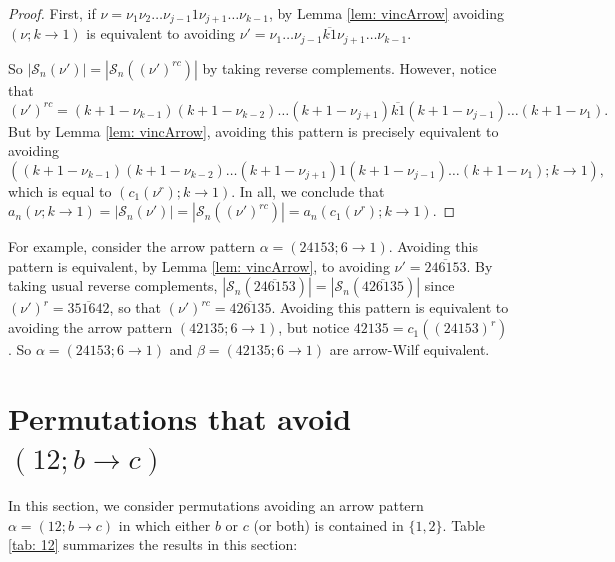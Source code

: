 \documentclass[11pt]{article}
\newcommand{\ol}[1]{\overline{#1}}
\renewcommand\S{\mathcal S}
\theoremstyle{definition}
\begin{document}
\begin{proof}
    First, if $\nu = \nu_1\nu_2\ldots \nu_{j-1} 1 \nu_{j+1} \ldots \nu_{k-1}$, by Lemma \ref{lem: vincArrow} avoiding $(\nu;k \to 1)$ is equivalent to avoiding $\nu' = \nu_1\ldots \nu_{j-1} \ol{k 1} \nu_{j+1} \ldots \nu_{k-1}$.

    So $|\S_n(\nu')| = |\S_n((\nu')^{rc})|$ by taking reverse complements. However, notice that \[(\nu')^{rc} = (k+1-\nu_{k-1})(k+1-\nu_{k-2}) \ldots (k+1-\nu_{j+1}) \ol{k1} (k+1-\nu_{j-1})\ldots (k+1-\nu_1).\] But by Lemma \ref{lem: vincArrow}, avoiding this pattern is precisely equivalent to avoiding \[((k+1-\nu_{k-1})(k+1-\nu_{k-2}) \ldots (k+1-\nu_{j+1}) 1 (k+1-\nu_{j-1})\ldots (k+1-\nu_1);k \to 1),\]
    which is equal to $ (c_1(\nu^r);k \to 1)$. In all, we conclude that $a_n(\nu; k \to 1) = |\S_n(\nu')| = |\S_n((\nu')^{rc})| = a_n(c_1(\nu^r);k \to 1)$. \end{proof}

For example, consider the arrow pattern $\alpha = (24153; 6 \to 1)$. Avoiding this pattern is equivalent, by Lemma \ref{lem: vincArrow}, to avoiding $\nu' = 24\ol{61}53$. By taking usual reverse complements, $|\S_n(24\ol{61}53)| = |\S_n(42\ol{61}35)|$ since $(\nu')^r = 35\ol{16}42$, so that $(\nu')^{rc} = 42\ol{61}35$. Avoiding this pattern is equivalent to avoiding the arrow pattern $(42135; 6 \to 1)$, but notice $42135 = c_1((24153)^r)$. So $\alpha = (24153; 6 \to 1)$ and $\beta = (42135; 6 \to 1)$ are arrow-Wilf equivalent.



\section{Permutations that avoid $(12;b\to c)$} \label{sec:12tbc}

In this section, we consider permutations avoiding an arrow pattern $\alpha =(12; b\to c)$ in which either $b$ or $c$ (or both) is contained in $\{1,2\}$. Table \ref{tab: 12} summarizes the results in this section:
\end{document}
